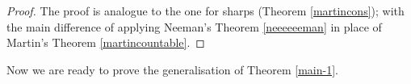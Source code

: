 \documentclass[10pt]{amsart}
\theoremstyle{definition}
\begin{document}
\begin{proof}
The proof is analogue to the one for sharps (Theorem \ref{martincons}); with the main difference of applying Neeman's Theorem \ref{neeeeeeman} in place of Martin's Theorem \ref{martincountable}.
\end{proof}

Now we are ready to prove the generalisation of Theorem \ref{main-1}.



\end{document}
